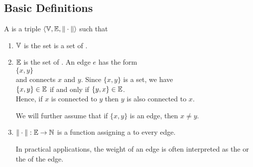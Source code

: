 \subsection{Basic Definitions}
\begin{Definition} A  is a triple 
   $\langle {\mathbb V}, {\mathbb E}, \|\cdot\| \rangle$ such that
  \begin{enumerate}
  \item ${\mathbb V}$ is the set is a set of  .
  \item ${\mathbb E}$ is the set of  .  An edge $e$ has the form
        \\[0.2cm]
        \hspace*{1.3cm}
        $\{x, y\}$
        \\[0.2cm]
        and connects $x$ and $y$.  Since $\{x,y\}$ is a set, we have
        \\[0.2cm]
        \hspace*{1.3cm}
        $\{x,y\} \in {\mathbb E}$ \quad if and only if $\{y,x\} \in {\mathbb E}$.
        \\[0.2cm]
        Hence, if $x$ is connected to $y$ then $y$ is also connected to $x$.

        We will further assume that if $\{x,y\}$ is an edge, then $x \not= y$.
  \item $\|\cdot\|: {\mathbb E} \rightarrow {\mathbb N}$ is a function assigning a  to every edge.

        In practical applications, the weight of an edge is often interpreted as the  or the
         of the edge.
        \conclude
  \end{enumerate}
\end{Definition}

